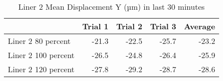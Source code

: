 \begin{table}[htbp]
\centering
\begin{tabular}{lrrrr}
\toprule
  & Trial 1 & Trial 2 & Trial 3 & Average \\
\midrule
 Liner 2 80 percent & -21.3 & -22.5 & -25.7 & -23.2 \\
 Liner 2 100 percent & -26.5 & -24.8 & -26.4 & -25.9 \\
 Liner 2 120 percent & -27.8 & -29.2 & -28.7 & -28.6 \\
\bottomrule
\end{tabular}
\caption{Liner 2 Mean Displacement Y (µm) in last 30 minutes}
\label{fig:liner_2_results_table}
\end{table}